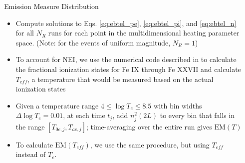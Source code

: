 \documentclass[final]{beamer}
\begin{document}
\begin{frame}
\begin{columns}[t]
\begin{column}{0.49\linewidth}
  \end{column}
  \begin{column}{0.49\linewidth}
    \begin{block}{Emission Measure Distribution}
      \vspace{-1ex}
      \begin{itemize}
        \item Compute solutions to Eqs. \ref{eq:ebtel_pe}, \ref{eq:ebtel_pi}, and \ref{eq:ebtel_n} for all $N_R$ runs for each point in the multidimensional heating parameter space. (Note: for the events of uniform magnitude, $N_R=1$)
        \item To account for NEI, we use the numerical code described in \citet{bradshaw_numerical_2009} to calculate the fractional ionization states for Fe IX through Fe XXVII and calculate $T_{eff}$, a temperature that would be measured based on the actual ionization states
        \item Given a temperature range $4\le\log{T_e}\le8.5$ with bin widths $\Delta\log{T_e}=0.01$, at each time $t_j$, add $n_j^2(2L)$ to every bin that falls in the range $[T_{0e,j},T_{ae,j}]$; time-averaging over the entire run gives $\mathrm{EM}(T)$
        \item To calculate $\mathrm{EM}(T_{eff})$, we use the same procedure, but using $T_{eff}$ instead of $T_e$.
      \end{itemize}
      \vspace{-2ex}
      \begin{figure}
        \centering
\end{figure}
\end{block}
\end{column}
\end{columns}
\end{frame}
\end{document}
